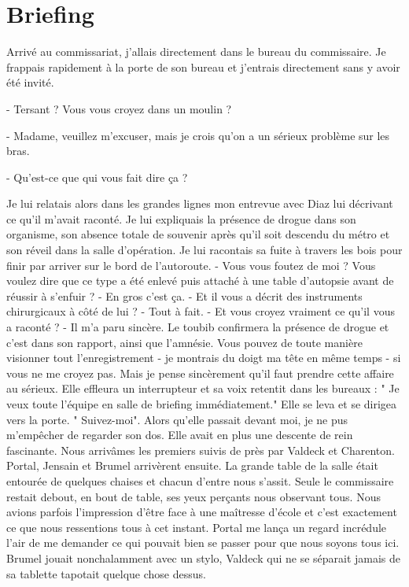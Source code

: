 \chapter{Briefing}

Arrivé au commissariat, j'allais directement dans le bureau du commissaire. Je frappais rapidement à la porte de son
bureau et j'entrais directement sans y avoir été invité.

- Tersant ? Vous vous croyez dans un moulin ?

- Madame, veuillez m'excuser, mais je crois qu'on a un sérieux problème sur les bras.

- Qu'est-ce que qui vous fait dire ça ?

Je lui relatais alors dans les grandes lignes mon  entrevue avec Diaz lui décrivant ce qu'il m'avait raconté. Je lui
expliquais la présence de drogue dans son organisme, son absence totale de souvenir après qu'il soit descendu du métro
et son réveil dans la salle d'opération. Je lui racontais sa fuite à travers les bois pour finir par arriver sur le
bord de l'autoroute.
- Vous vous foutez de moi ? Vous voulez dire que ce type a été enlevé puis attaché à une table d'autopsie avant de
réussir à s'enfuir ?
- En gros c'est ça.
- Et il vous a décrit des instruments chirurgicaux à côté de lui ?
- Tout à fait.
- Et vous croyez vraiment ce qu'il vous a raconté ?
- Il m'a paru sincère. Le toubib confirmera la présence de drogue et c'est dans son rapport, ainsi que l'amnésie. Vous
pouvez de toute manière visionner tout l'enregistrement - je montrais du doigt ma tête en même temps - si vous ne me
croyez pas. Mais je pense sincèrement qu'il faut prendre cette affaire au sérieux.
Elle effleura un interrupteur et sa voix retentit dans les bureaux : " Je veux toute l'équipe en salle de briefing
immédiatement." Elle se leva et se dirigea vers la porte. " Suivez-moi". Alors qu'elle passait devant moi, je ne pus
m'empêcher de regarder son dos. Elle avait en plus une descente de rein fascinante. 
Nous arrivâmes les premiers suivis de près par Valdeck et Charenton. Portal, Jensain et Brumel arrivèrent ensuite. La
grande table de la salle était entourée de quelques chaises et chacun d'entre nous s'assit. Seule le commissaire restait
debout, en bout de table, ses yeux perçants nous observant tous. Nous avions parfois l'impression d'être face à une
maîtresse d'école et c'est exactement ce que nous ressentions tous à cet instant.
Portal me lança un regard incrédule l'air de me demander ce qui pouvait bien se passer pour que nous soyons tous ici.
Brumel jouait nonchalamment avec un stylo, Valdeck qui ne se séparait jamais de sa tablette tapotait quelque chose dessus.
